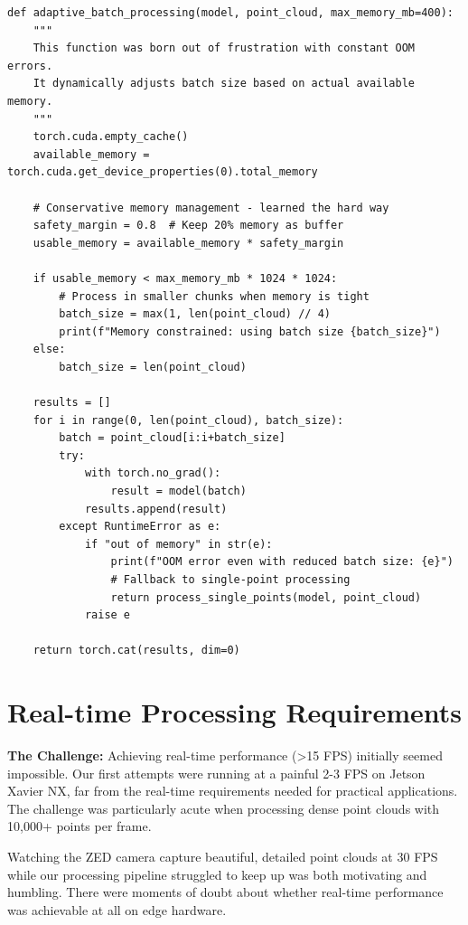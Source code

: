 \documentclass[12pt,a4paper]{report}
\begin{document}
\begin{lstlisting}[caption=Adaptive Batch Processing - Born from Necessity, label=lst:adaptive_batch]
def adaptive_batch_processing(model, point_cloud, max_memory_mb=400):
    """
    This function was born out of frustration with constant OOM errors.
    It dynamically adjusts batch size based on actual available memory.
    """
    torch.cuda.empty_cache()
    available_memory = torch.cuda.get_device_properties(0).total_memory
    
    # Conservative memory management - learned the hard way
    safety_margin = 0.8  # Keep 20% memory as buffer
    usable_memory = available_memory * safety_margin

    if usable_memory < max_memory_mb * 1024 * 1024:
        # Process in smaller chunks when memory is tight
        batch_size = max(1, len(point_cloud) // 4)
        print(f"Memory constrained: using batch size {batch_size}")
    else:
        batch_size = len(point_cloud)

    results = []
    for i in range(0, len(point_cloud), batch_size):
        batch = point_cloud[i:i+batch_size]
        try:
            with torch.no_grad():
                result = model(batch)
            results.append(result)
        except RuntimeError as e:
            if "out of memory" in str(e):
                print(f"OOM error even with reduced batch size: {e}")
                # Fallback to single-point processing
                return process_single_points(model, point_cloud)
            raise e

    return torch.cat(results, dim=0)
\end{lstlisting}

\section{Real-time Processing Requirements}

\textbf{The Challenge:} Achieving real-time performance (>15 FPS) initially seemed impossible. Our first attempts were running at a painful 2-3 FPS on Jetson Xavier NX, far from the real-time requirements needed for practical applications. The challenge was particularly acute when processing dense point clouds with 10,000+ points per frame.

Watching the ZED camera capture beautiful, detailed point clouds at 30 FPS while our processing pipeline struggled to keep up was both motivating and humbling. There were moments of doubt about whether real-time performance was achievable at all on edge hardware.
\end{document}
